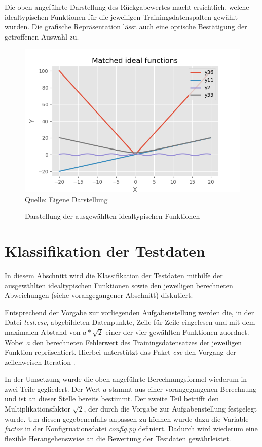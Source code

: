Die oben angeführte Darstellung des Rückgabewertes macht ersichtlich, welche idealtypischen Funktionen für die jeweiligen Trainingsdatenspalten gewählt wurden. Die grafische Repräsentation lässt auch eine optische Bestätigung der getroffenen Auswahl zu.

\begin{figure}[h]
\centering
\caption{Darstellung der ausgewählten idealtypischen Funktionen}
\includegraphics[width=13cm]{../output/figures/ideal.png}\\
Quelle: Eigene Darstellung
\label{fig:ideal}
\end{figure}

\section{Klassifikation der Testdaten}
\label{sec:class}

In diesem Abschnitt wird die Klassifikation der Testdaten mithilfe der ausgewählten idealtypischen Funktionen sowie den jeweiligen berechneten Abweichungen (siehe vorangegangener Abschnitt) diskutiert.

Entsprechend der Vorgabe zur vorliegenden Aufgabenstellung werden die, in der Datei \emph{test.csv}, abgebildeten Datenpunkte, Zeile für Zeile eingelesen und mit dem maximalen Abstand von $ a*\sqrt{2}$ einer der vier gewählten Funktionen zuordnet. Wobei $a$ den berechneten Fehlerwert des Trainingsdatensatzes der jeweiligen Funktion repräsentiert. Hierbei unterstützt das Paket \emph{csv} den Vorgang der zeilenweisen Iteration \citep{python_software_foundation_csv_nodate-1}.

In der Umsetzung wurde die oben angeführte Berechnungsformel wiederum in zwei Teile gegliedert. Der Wert $a$ stammt aus einer vorangegangenen Berechnung und ist an dieser Stelle bereits bestimmt. Der zweite Teil betrifft den Multiplikationsfaktor $\sqrt{2}$, der durch die Vorgabe zur Aufgabenstellung festgelegt wurde. Um diesen gegebenenfalls anpassen zu können wurde dazu die Variable \emph{factor} in der Konfigruationsdatei \emph{config.py} definiert. Dadurch wird wiederum eine flexible Herangehensweise an die Bewertung der Testdaten gewährleistet.

